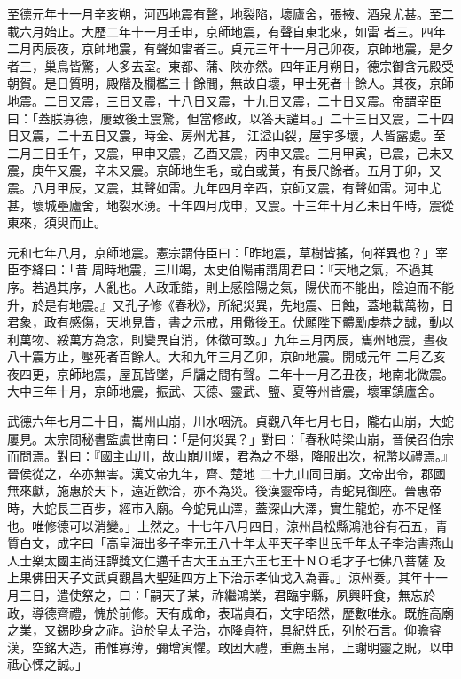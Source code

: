 \begin{pinyinscope}
 至德元年十一月辛亥朔，河西地震有聲，地裂陷，壞廬舍，張掖、酒泉尤甚。至二載六月始止。大歷二年十一月壬申，京師地震，有聲自東北來，如雷
 者三。四年二月丙辰夜，京師地震，有聲如雷者三。貞元三年十一月己卯夜，京師地震，是夕者三，巢鳥皆驚，人多去室。東都、蒲、陜亦然。四年正月朔日，德宗御含元殿受朝賀。是日質明，殿階及欄檻三十餘間，無故自壞，甲士死者十餘人。其夜，京師地震。二日又震，三日又震，十八日又震，十九日又震，二十日又震。帝謂宰臣曰：「蓋朕寡德，屢致後土震驚，但當修政，以答天譴耳。」二十三日又震，二十四日又震，二十五日又震，時金、房州尤甚，
 江溢山裂，屋宇多壞，人皆露處。至二月三日壬午，又震，甲申又震，乙酉又震，丙申又震。三月甲寅，已震，己未又震，庚午又震，辛未又震。京師地生毛，或白或黃，有長尺餘者。五月丁卯，又震。八月甲辰，又震，其聲如雷。九年四月辛酉，京師又震，有聲如雷。河中尤甚，壞城壘廬舍，地裂水湧。十年四月戊申，又震。十三年十月乙未日午時，震從東來，須臾而止。



 元和七年八月，京師地震。憲宗謂侍臣曰：「昨地震，草樹皆搖，何祥異也？」宰臣李絳曰：「昔
 周時地震，三川竭，太史伯陽甫謂周君曰：『天地之氣，不過其序。若過其序，人亂也。人政乖錯，則上感陰陽之氣，陽伏而不能出，陰迫而不能升，於是有地震。』又孔子修《春秋》，所紀災異，先地震、日蝕，蓋地載萬物，日君象，政有感傷，天地見眚，書之示戒，用儆後王。伏願陛下體勵虔恭之誠，動以利萬物、綏萬方為念，則變異自消，休徵可致。」九年三月丙辰，巂州地震，晝夜八十震方止，壓死者百餘人。大和九年三月乙卯，京師地震。開成元年
 二月乙亥夜四更，京師地震，屋瓦皆墜，戶牖之間有聲。二年十一月乙丑夜，地南北微震。大中三年十月，京師地震，振武、天德、靈武、鹽、夏等州皆震，壞軍鎮廬舍。



 武德六年七月二十日，巂州山崩，川水咽流。貞觀八年七月七日，隴右山崩，大蛇屢見。太宗問秘書監虞世南曰：「是何災異？」對曰：「春秋時梁山崩，晉侯召伯宗而問焉。對曰：『國主山川，故山崩川竭，君為之不舉，降服出次，祝幣以禮焉。』晉侯從之，卒亦無害。漢文帝九年，齊、楚地
 二十九山同日崩。文帝出令，郡國無來獻，施惠於天下，遠近歡洽，亦不為災。後漢靈帝時，青蛇見御座。晉惠帝時，大蛇長三百步，經市入廟。今蛇見山澤，蓋深山大澤，實生龍蛇，亦不足怪也。唯修德可以消變。」上然之。十七年八月四日，涼州昌松縣鴻池谷有石五，青質白文，成字曰「高皇海出多子李元王八十年太平天子李世民千年太子李治書燕山人士樂太國主尚汪譚獎文仁邁千古大王五王六王七王十ＮＯ毛才子七佛八菩薩
 及上果佛田天子文武貞觀昌大聖延四方上下治示孝仙戈入為善。」涼州奏。其年十一月三日，遣使祭之，曰：「嗣天子某，祚繼鴻業，君臨宇縣，夙興旰食，無忘於政，導德齊禮，愧於前修。天有成命，表瑞貞石，文字昭然，歷數唯永。既旌高廟之業，又錫眇身之祚。迨於皇太子治，亦降貞符，具紀姓氏，列於石言。仰瞻睿漢，空銘大造，甫惟寡薄，彌增寅懼。敢因大禮，重薦玉帛，上謝明靈之貺，以申祗心慄之誠。」




\end{pinyinscope}
